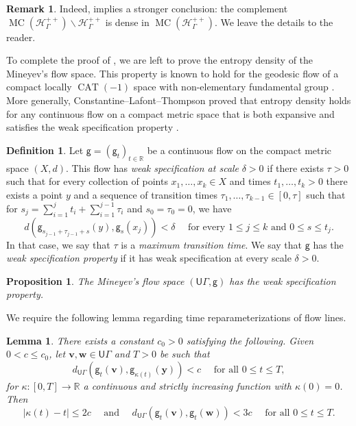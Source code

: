 \documentclass[twoside]{amsart}
\newtheorem{proposition}[theorem]{Proposition}
\newtheorem{lemma}[theorem]{Lemma}
\theoremstyle{definition}
\newtheorem{definition}[theorem]{Definition}
\newtheorem{remark}[theorem]{Remark}
\numberwithin{equation}{section}
\numberwithin{theorem}{section}
\newcommand{\msf}[1]{\mathsf{#1}}
\newcommand{\R}{\mathbb{R}}
\newcommand{\scrH}{\mathscr{H}}
\newcommand{\G}{\Gamma}
\newcommand{\del}{\delta}
\renewcommand{\k}{\kappa}
\DeclareMathOperator{\CAT}{CAT}
\newcommand{\bs}{\backslash}
\newcommand{\ra}{\rightarrow}
\newcommand{\vv}{\mathbf{v}}
\newcommand{\vw}{\mathbf{w}}
\newcommand{\vy}{\mathbf{y}}
\newcommand{\UG}{\msf{U}\G}
\DeclareMathOperator{\MC}{MC}
\newcommand{\vg}{\msf{g}}
\begin{document}
\begin{remark}
Indeed,  implies a stronger conclusion: the complement $\MC(\scrH_\G^{++}) \bs \scrH_\G^{++}$ is dense in $\MC(\scrH_\G^{++})$. 
We leave the details to the reader.
\end{remark}

To complete the proof of , we are left to prove the entropy density of the Mineyev's flow space. This property is known to hold for the geodesic flow of a compact locally $\CAT(-1)$ space with non-elementary fundamental group \cite[Theorem~B]{CLT.weak}.
More generally, Constantine--Lafont--Thompson proved that entropy density holds for any continuous flow on a compact metric space that is both expansive and satisfies the weak specification property \cite[Theorem~5.1]{CLT.weak}.

\begin{definition}
Let $\vg=(\vg_t)_{t\in \R}$ be a continuous flow on the compact metric space $(X,d)$. This flow  has \emph{weak specification at scale} $\del>0$ if there exists $\tau > 0$ such that for
every collection of points $x_1,\dots,x_k\in X$ and times $t_1,\dots,t_k>0$ there exists a point $y$ and a
sequence of transition times $\tau_1,\dots,\tau_{k-1}\in [0, \tau]$ such that for $s_j = \sum_{i=1}^j{t_i} + \sum_{i=1}^{j-1}{\tau_i}$ and $s_0 = \tau_0 = 0$, we have
\begin{equation*}
   d(\vg_{s_{j-1}+\tau_{j-1}+s}(y), \vg_s(x_j)) < \del \quad \text{ for every } 1\leq j\leq k \text{ and }0\leq s\leq t_j.  
\end{equation*}
In that case, we say that $\tau$ is a \emph{maximum transition time}. We say that $\vg$ has the \emph{weak specification property} if it has weak specification at every scale $\del > 0$.
\end{definition}


\begin{proposition}\label{prop:weakspecification}
    The Mineyev's flow space $(\UG,\vg)$ has the weak specification property. 
\end{proposition}

We require the following lemma regarding time reparameterizations of flow lines.

\begin{lemma}\label{lem:timechange}
    There exists a constant $c_0>0$ satisfying the following. Given $0<c\leq c_0$, let $\vv,\vw\in \UG$ and $T>0$ be  such that 
    \[d_{\UG}(\vg_t(\vv),\vg_{\k(t)}(\vy))<c \quad \text{ for all }0\leq t\leq T, \]
    for $\k:[0,T]\ra \R$ a continuous and strictly increasing function with $\k(0)=0$. Then \[|\k(t)-t|\leq 2c \quad \text{ and }\quad d_{\UG}(\vg_t(\vv),\vg_t(\vw))< 3c \quad  \text{ for all } 0\leq t \leq T.\]
\end{lemma}
\end{document}

